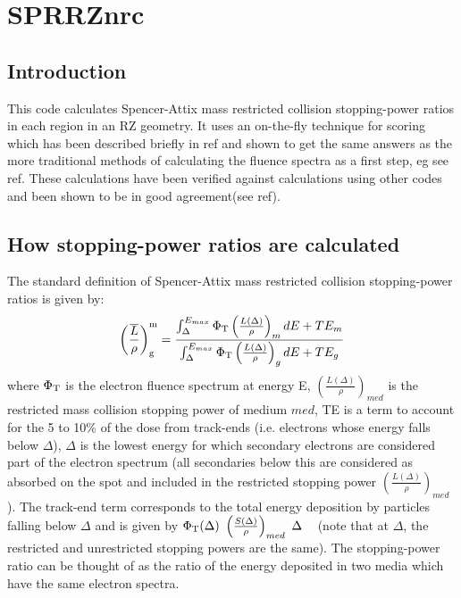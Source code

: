 \documentclass[12pt,twoside]{article}  %
\newcommand{\sprt}[2]{\left(\frac{\overline{L}}{\rho}\right)^{\rm #1}_{\rm #2}}
\newcommand{\eqn}[1]{\begin{equation} #1 \end{equation} }
\newcommand{\rsp}[1]{\left( \frac{L(\Delta)}{\rho} \right)_{#1}}
\newcommand{\PhiT}{\Phi_{\rm T}}
\newcommand{\rspt}[1]{\left( \frac{S(\Delta)}{\rho} \right)_{#1}}
\begin{document}
\section{SPRRZnrc}
\renewcommand{\leftmark}{{SPRRZnrc}}

\subsection{Introduction}

This code calculates Spencer-Attix mass restricted collision stopping-power 
ratios in each region in an RZ geometry.  It uses an on-the-fly technique
for scoring which has been described briefly in ref\cite{KR93} and shown to get the
same answers as the more traditional methods of calculating the fluence
spectra as a first step, eg see ref\cite{Ma91}.  These calculations have been verified against
calculations using other codes and been shown to be in good agreement(see
ref\cite{Ma91,KR93}).

\subsection[Calculating SPRs]{How stopping-power ratios are calculated}

The standard definition of Spencer-Attix mass restricted collision
stopping-power
ratios is given by\cite{Ro96,ICRU35}:
\eqn{ \sprt{m}{g} = \frac{\int_{\Delta}^{E_{max}} \PhiT
\rsp{m} dE + TE_{m} } {\int_{\Delta}^{E_{max}} \PhiT \rsp{g} dE + TE_{g} }
\label{eq_sa_spr} }
where $\PhiT$ is the electron fluence spectrum at energy E, $\rsp{med}$ is
the restricted mass collision stopping power of medium $med$,  TE
is a term to account for the 5 to 10\% of the dose from track-ends
(i.e. electrons whose energy falls below $\Delta$), $\Delta$ is the
lowest energy for which secondary electrons are considered part of the
electron spectrum (all secondaries below this are considered as absorbed
on the spot and included in the restricted stopping power $\rsp{med}$).
The track-end term corresponds to the total energy deposition by particles
falling below $\Delta$ and is given by $\PhiT(\Delta)~\rspt{med}~\Delta$
~\cite{ICRU35,Na78} (note that at $\Delta$, the restricted and unrestricted
stopping powers are the same). The stopping-power ratio can be thought of
as the ratio of the energy deposited in two media which have the same
electron spectra.
\end{document}
